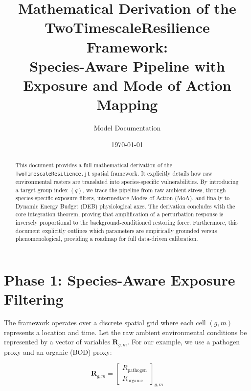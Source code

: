 \documentclass[11pt,a4paper]{article}
\title{Mathematical Derivation of the TwoTimescaleResilience Framework:\\
Species-Aware Pipeline with Exposure and Mode of Action Mapping}
\author{Model Documentation}
\date{\today}
\begin{document}
\maketitle

\begin{abstract}
This document provides a full mathematical derivation of the \texttt{TwoTimescaleResilience.jl} spatial framework. It explicitly details how raw environmental rasters are translated into species-specific vulnerabilities. By introducing a target group index $(q)$, we trace the pipeline from raw ambient stress, through species-specific exposure filters, intermediate Modes of Action (MoA), and finally to Dynamic Energy Budget (DEB) physiological axes. The derivation concludes with the core integration theorem, proving that amplification of a perturbation response is inversely proportional to the background-conditioned restoring force. Furthermore, this document explicitly outlines which parameters are empirically grounded versus phenomenological, providing a roadmap for full data-driven calibration.
\end{abstract}

\section{Phase 1: Species-Aware Exposure Filtering}

The framework operates over a discrete spatial grid where each cell $(g,m)$ represents a location and time. Let the raw ambient environmental conditions be represented by a vector of variables $\bm{R}_{g,m}$. For our example, we use a pathogen proxy and an organic (BOD) proxy:

\begin{equation}
\bm{R}_{g,m}=\begin{bmatrix}R_{\mathrm{pathogen}}\\ R_{\mathrm{organic}}\end{bmatrix}_{g,m}
\end{equation}
\end{document}

